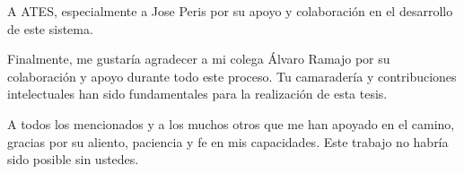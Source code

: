 \documentclass[oneside, 12pt, a4paper]{book}
\begin{document}
A ATES, especialmente a Jose Peris por su apoyo y colaboración en el desarrollo de este sistema.

Finalmente, me gustaría agradecer a mi colega Álvaro Ramajo por su colaboración y apoyo durante todo este proceso. Tu camaradería y contribuciones intelectuales han sido fundamentales para la realización de esta tesis.

A todos los mencionados y a los muchos otros que me han apoyado en el camino, gracias por su aliento, paciencia y fe en mis capacidades. Este trabajo no habría sido posible sin ustedes.

\endgroup

\blankpage%

\renewcommand{\contentsname}{Table of Contents}
\tableofcontents

\blankpage%

\listoffigures

\blankpage%

\listoftables

\blankpage%

\printglossary[type=\acronymtype,style=long, title=List of Acronyms]

\blankpage%

\mainmatter%










\label{part:theoretical_background}




\label{part:state_of_the_art}




\label{part:methodology}





\label{part:results}




\label{part:conclusions}




\blankpage%
\printbibliography%
\end{document}
